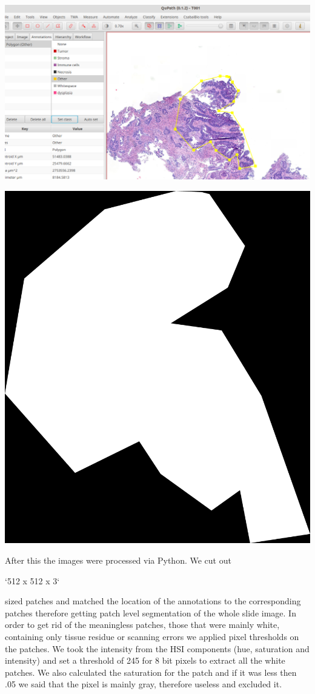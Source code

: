 \documentclass[a4paper,12pt]{article}
\begin{document}
\vspace{7mm}

\begin{minipage}[t]{0.4\textwidth}
    \centering
    \includegraphics[width=\linewidth]{qupath_screenshot.png}
    \label{fig:annotation_qupath}
\end{minipage}\qquad\qquad
\begin{minipage}[t]{0.4\textwidth}
    \centering
    \includegraphics[width=.5\linewidth]{T001_Other_(4.00,416425,200638,17047,19660)-mask.png}
    \label{fig:annotation}
\end{minipage}

\vspace{7mm}

\par After this the images were processed via Python. We cut out \begin{markdown} 
`512 x 512 x 3`  
\end{markdown} 
sized patches and matched the location of the annotations to the corresponding patches therefore getting patch level segmentation of the whole slide image. In order to get rid of the meaningless patches, those that were mainly white, containing only tissue residue or scanning errors we applied pixel thresholds on the patches. We took the intensity from the HSI components (hue, saturation and intensity) and set a threshold of 245 for 8 bit pixels to extract all the white patches. We also calculated the saturation for the patch and if it was less then .05 we said that the pixel is mainly gray, therefore useless and excluded it.
\end{document}
